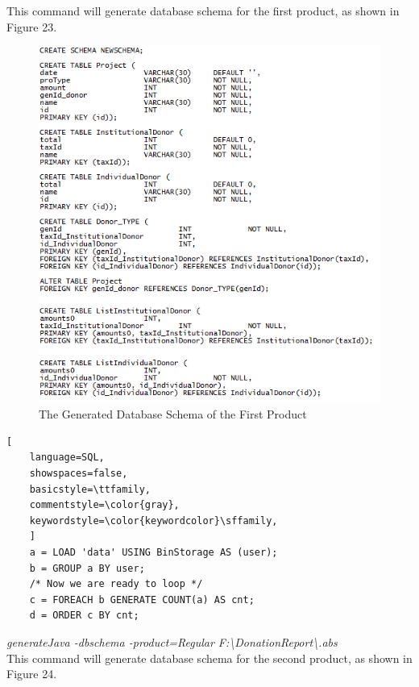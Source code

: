 \documentclass[runningheads,a4paper]{llncs}
\begin{document}
This command will generate database schema for the first product, as shown in Figure 23.\\

\begin{figure}
	\centering
	\includegraphics[scale=0.7]{create1.png}
	\caption{The Generated Database Schema of the First Product}
	\label{Figure 23}
\end{figure}

\begin{lstlisting}[
	language=SQL,
	showspaces=false,
	basicstyle=\ttfamily,
	commentstyle=\color{gray},
	keywordstyle=\color{keywordcolor}\sffamily,
	]
	a = LOAD 'data' USING BinStorage AS (user);
	b = GROUP a BY user;
	/* Now we are ready to loop */
	c = FOREACH b GENERATE COUNT(a) AS cnt;
	d = ORDER c BY cnt;
\end{lstlisting}


\emph{generateJava -dbschema -product=Regular F:\textbackslash DonationReport\textbackslash *.abs}\\

This command will generate database schema for the second product, as shown in Figure 24.\\
\end{document}
